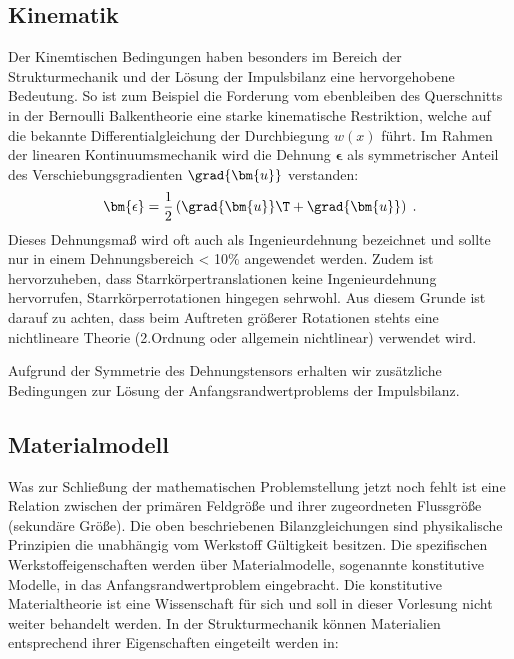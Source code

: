 \documentclass[letterpaper,10pt,german]{jupyterBook}
\begin{document}
\subsection{Kinematik}
\label{\detokenize{chapters/chapter1/elasticity:kinematik}}
\sphinxAtStartPar
Der Kinemtischen Bedingungen haben besonders im Bereich der Strukturmechanik und der Lösung der Impulsbilanz eine hervorgehobene Bedeutung. So ist zum Beispiel die Forderung vom ebenbleiben des Querschnitts in der Bernoulli Balkentheorie eine starke kinematische Restriktion, welche auf die bekannte Differentialgleichung der Durchbiegung \(w(x)\) führt.
Im Rahmen der linearen Kontinuumsmechanik wird die Dehnung \(\bm{\epsilon}\) als symmetrischer Anteil des Verschiebungsgradienten \(\grad{\bm{u}}\) verstanden:
\begin{equation}\label{equation:chapters/chapter1/elasticity:linearStrain}
\begin{split}\bm{\epsilon} = \frac{1}{2} \left(\grad{\bm{u}}\T + \grad{\bm{u}} \right) \; .\end{split}
\end{equation}
\sphinxAtStartPar
Dieses Dehnungsmaß wird oft auch als Ingenieurdehnung bezeichnet und sollte nur in einem Dehnungsbereich < 10\% angewendet werden. Zudem ist hervorzuheben, dass Starrkörpertranslationen keine Ingenieurdehnung hervorrufen, Starrkörperrotationen hingegen sehrwohl. Aus diesem Grunde ist darauf zu achten, dass beim Auftreten größerer Rotationen stehts eine nichtlineare Theorie (2.Ordnung oder allgemein nichtlinear) verwendet wird.

\sphinxAtStartPar
Aufgrund der Symmetrie des Dehnungstensors erhalten wir  zusätzliche Bedingungen zur Lösung der Anfangsrandwertproblems der Impulsbilanz.


\subsection{Materialmodell}
\label{\detokenize{chapters/chapter1/elasticity:materialmodell}}
\sphinxAtStartPar
Was zur Schließung der mathematischen Problemstellung jetzt noch fehlt ist eine Relation zwischen der primären Feldgröße und ihrer zugeordneten Flussgröße (sekundäre Größe). Die oben beschriebenen Bilanzgleichungen sind physikalische Prinzipien die unabhängig vom Werkstoff Gültigkeit besitzen. Die spezifischen Werkstoffeigenschaften werden über Materialmodelle, sogenannte konstitutive Modelle, in das Anfangsrandwertproblem eingebracht. Die konstitutive Materialtheorie ist eine Wissenschaft für sich und soll in dieser Vorlesung nicht weiter behandelt werden. In der Strukturmechanik können Materialien entsprechend ihrer Eigenschaften eingeteilt werden in:
\end{document}
